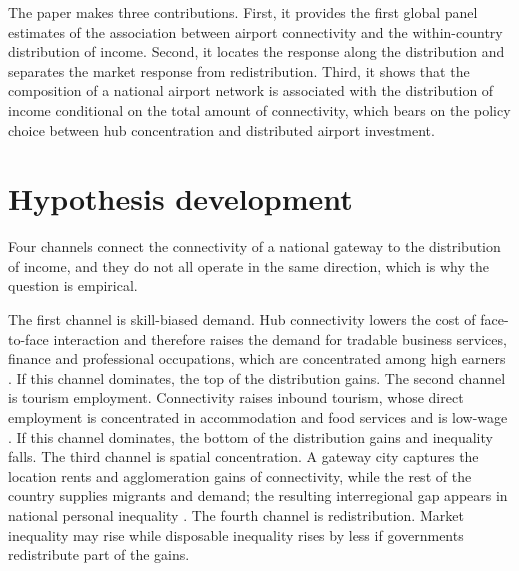 The paper makes three contributions. First, it provides the first global panel estimates of the association between airport connectivity and the within-country distribution of income. Second, it locates the response along the distribution and separates the market response from redistribution. Third, it shows that the composition of a national airport network is associated with the distribution of income conditional on the total amount of connectivity, which bears on the policy choice between hub concentration and distributed airport investment.

\section{Hypothesis development}
\label{sec:framework}
Four channels connect the connectivity of a national gateway to the distribution of income, and they do not all operate in the same direction, which is why the question is empirical.

The first channel is skill-biased demand. Hub connectivity lowers the cost of face-to-face interaction and therefore raises the demand for tradable business services, finance and professional occupations, which are concentrated among high earners \citep{Allen_2014,Brueckner_2003}. If this channel dominates, the top of the distribution gains. The second channel is tourism employment. Connectivity raises inbound tourism, whose direct employment is concentrated in accommodation and food services and is low-wage \citep{Khadaroo_2008}. If this channel dominates, the bottom of the distribution gains and inequality falls. The third channel is spatial concentration. A gateway city captures the location rents and agglomeration gains of connectivity, while the rest of the country supplies migrants and demand; the resulting interregional gap appears in national personal inequality \citep{Redding_2004}. The fourth channel is redistribution. Market inequality may rise while disposable inequality rises by less if governments redistribute part of the gains.

